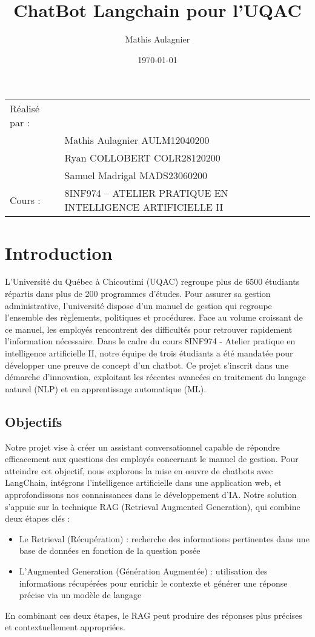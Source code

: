 \documentclass{article}
\title{ChatBot Langchain pour l'UQAC}
\author{Mathis Aulagnier}
\date{\today}
\begin{document}
\maketitle
\noindent\begin{tabular}{@{}ll}
    Réalisé par :\\
        & Mathis Aulagnier AULM12040200 \\
        & Ryan COLLOBERT COLR28120200 \\
        & Samuel Madrigal MADS23060200 \\
    Cours :  &  8INF974 – ATELIER PRATIQUE EN INTELLIGENCE ARTIFICIELLE II \\
\end{tabular}

\section{Introduction}

L'Université du Québec à Chicoutimi (UQAC) regroupe plus de 6500 étudiants répartis dans plus de 200 programmes d'études. Pour assurer sa gestion administrative, l'université dispose d'un manuel de gestion qui regroupe l'ensemble des règlements, politiques et procédures. Face au volume croissant de ce manuel, les employés rencontrent des difficultés pour retrouver rapidement l'information nécessaire.
Dans le cadre du cours 8INF974 - Atelier pratique en intelligence artificielle II, notre équipe de trois étudiants a été mandatée pour développer une preuve de concept d'un chatbot. Ce projet s'inscrit dans une démarche d'innovation, exploitant les récentes avancées en traitement du langage naturel (NLP) et en apprentissage automatique (ML).
\subsection{Objectifs} Notre projet vise à créer un assistant conversationnel capable de répondre efficacement aux questions des employés concernant le manuel de gestion. Pour atteindre cet objectif, nous explorons la mise en œuvre de chatbots avec LangChain, intégrons l'intelligence artificielle dans une application web, et approfondissons nos connaissances dans le développement d'IA.
Notre solution s'appuie sur la technique RAG (Retrieval Augmented Generation), qui combine deux étapes clés : 
\begin{itemize} 
    \item Le Retrieval (Récupération) : recherche des informations pertinentes dans une base de données en fonction de la question posée 
    \item L'Augmented Generation (Génération Augmentée) : utilisation des informations récupérées pour enrichir le contexte et générer une réponse précise via un modèle de langage 
\end{itemize}
En combinant ces deux étapes, le RAG peut produire des réponses plus précises et contextuellement appropriées.
\end{document}
